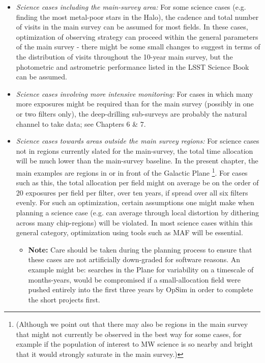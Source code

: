 \begin{itemize}
\item {\it Science cases including the main-survey area:} For some
  science cases (e.g. finding the most metal-poor stars in the Halo),
  the cadence and total number of visits in the main survey can be
  assumed for most fields. In these cases, optimization of observing
  strategy can proceed within the general parameters of the main
  survey - there might be some small changes to suggest in terms of
  the distribution of visits throughout the 10-year main survey, but
  the photometric and astrometric performance listed in the LSST
  Science Book can be assumed.
\item {\it Science cases involving more intensive monitoring:} For
  cases in which many more exposures might be required than for the
  main survey (possibly in one or two filters only), the deep-drilling
  sub-surveys are probably the natural channel to take data; see
  Chapters 6 \& 7.
\item {\it Science cases towards areas outside the main survey
  regions:} For science cases not in regions currently slated for the
  main-survey, the total time allocation will be much lower than the
  main-survey baseline. In the present chapter, the main examples are regions in or in front of the Galactic Plane \footnote{(Although we point out that there may
  also be regions in the main survey that might not currently be
  observed in the best way for some cases, for example if the
  population of interest to MW science is so nearby and bright that it
  would strongly saturate in the main survey.)}. For cases such as this,
  the total allocation per field might on average be on the order of
  20 exposures per field per filter, over ten years, if spread over
  all six filters evenly. For such an optimization, certain
  assumptions one might make when planning a science case (e.g. can
  average through local distortion by dithering across many
  chip-regions) will be violated. In most science cases within this
  general category, optimization using tools such as MAF will be
  essential.
  \begin{itemize}
    \item {\bf Note:} Care should be taken during the planning process
      to ensure that these cases are not artificially down-graded for
      software reasons. An example might be: searches in the Plane for
      variability on a timescale of months-years, would be compromised
      if a small-allocation field were pushed entirely into the first
      three years by OpSim in order to complete the short projects
      first.
    \end{itemize}
\end{itemize}

